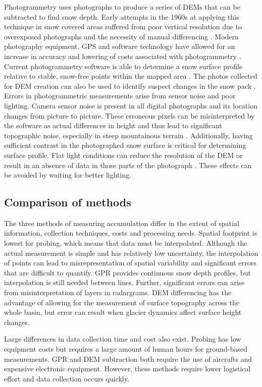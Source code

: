 \documentclass{sfuthesis}
\begin{document}
Photogrammetry uses photographs to produce a series of DEMs that can be subtracted to find snow depth. Early attempts in the 1960s at applying this technique in snow covered areas suffered from poor vertical resolution due to overexposed photographs and the necessity of manual differencing \citep{Nolan2015}. Modern photography equipment, GPS and software technology have allowed for an increase in accuracy and lowering of costs associated with photogrammetry \citep{Nolan2015}. Current photogrammetry software is able to determine a snow surface profile relative to stable, snow-free points within the mapped area \citep{Farinotti2010}. The photos collected for DEM creation can also be used to identify suspect changes in the snow pack \citep{Nolan2015}.
Errors in photogrammetric measurements arise from sensor noise and poor lighting. Camera sensor noise is present in all digital photographs and its location changes from picture to picture. These erroneous pixels can be misinterpreted by the software as actual differences in height and thus lead to significant topographic noise, especially in steep mountainous terrain \citep{Nolan2015}. Additionally, having sufficient contrast in the photographed snow surface is critical for determining surface profile. Flat light conditions can reduce the resolution of the DEM or result in an absence of data in those parts of the photograph \citep{Nolan2015}. These effects can be avoided by waiting for better lighting. 

\subsection{Comparison of methods}
\label{sec:comparemethods}
The three methods of measuring accumulation differ in the extent of spatial information, collection techniques, costs and processing needs. Spatial footprint is lowest for probing, which means that data must be interpolated. Although the actual measurement is simple and has relatively low uncertainty, the interpolation of points can lead to misrepresentation of spatial variability and significant errors that are difficult to quantify. GPR provides continuous snow depth profiles, but interpolation is still needed between lines. Further, significant errors can arise from misinterpretation of layers in radargrams. DEM differencing has the advantage of allowing for the measurement of surface topography across the whole basin, but error can result when glacier dynamics affect surface height changes. 

Large differences in data collection time and cost also exist. Probing has low equipment costs but requires a large amount of human hours for ground-based measurements. GPR and DEM subtraction both require the use of aircrafts and expensive electronic equipment. However, these methods require lower logistical effort and data collection occurs quickly.  
\end{document}
